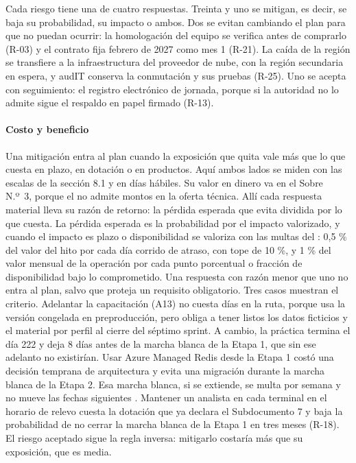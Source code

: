 Cada riesgo tiene una de cuatro respuestas. Treinta y uno se mitigan, es decir, se baja su probabilidad,
su impacto o ambos. Dos se evitan cambiando el plan para que no puedan ocurrir: la homologación del
equipo se verifica antes de comprarlo (R-03) y el contrato fija febrero de 2027 como mes 1 (R-21). La
caída de la región se transfiere a la infraestructura del proveedor de nube, con la región secundaria en
espera, y audIT conserva la conmutación y sus pruebas (R-25). Uno se acepta con seguimiento: el registro
electrónico de jornada, porque si la autoridad no lo admite sigue el respaldo en papel firmado (R-13).

\paragraph{Costo y beneficio}
Una mitigación entra al plan cuando la exposición que quita vale más que lo que cuesta en plazo, en
dotación o en productos. Aquí ambos lados se miden con las escalas de la sección 8.1 y en días hábiles.
Su valor en dinero va en el Sobre N.º~3, porque el  no admite montos en la oferta técnica.
Allí cada respuesta material lleva su razón de retorno: la pérdida esperada que evita dividida por lo que
cuesta. La pérdida esperada es la probabilidad por el impacto valorizado, y cuando el impacto es plazo o
disponibilidad se valoriza con las multas del : 0,5 \% del valor del hito por cada día
corrido de atraso, con tope de 10 \%, y 1 \% del valor mensual de la operación por cada punto porcentual
o fracción de disponibilidad bajo lo comprometido. Una respuesta con razón menor que uno no entra al plan, salvo que proteja un
requisito obligatorio. Tres casos muestran el criterio. Adelantar la capacitación (A13) no cuesta días en la ruta, porque usa
la versión congelada en preproducción, pero obliga a tener listos los datos ficticios y el material por
perfil al cierre del séptimo sprint. A cambio, la práctica termina el día 222 y deja 8 días antes de la
marcha blanca de la Etapa 1, que sin ese adelanto no existirían. Usar Azure Managed Redis desde la Etapa 1 costó una decisión temprana de
arquitectura y evita una migración durante la marcha blanca de la Etapa 2. Esa marcha blanca, si se
extiende, se multa por semana  y no mueve las fechas siguientes . Mantener un
analista en cada terminal en el horario de relevo cuesta la dotación que ya declara el Subdocumento 7 y
baja la probabilidad de no cerrar la marcha blanca de la Etapa 1 en tres meses (R-18). El riesgo
aceptado sigue la regla inversa: mitigarlo costaría más que su exposición, que es media.

